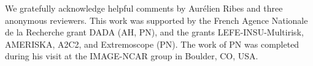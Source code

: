 \documentclass[12pt]{article}
\begin{document}






\begin{acknowledgment}
We gratefully acknowledge helpful comments by Aur\'elien Ribes and three anonymous reviewers. This work was supported by the French Agence Nationale de la Recherche grant DADA (AH, PN), and the grants LEFE-INSU-Multirisk, AMERISKA, A2C2, and Extremoscope (PN). The work of PN was completed  during his visit at the IMAGE-NCAR group in Boulder, CO, USA.
\end{acknowledgment}

\end{document}
